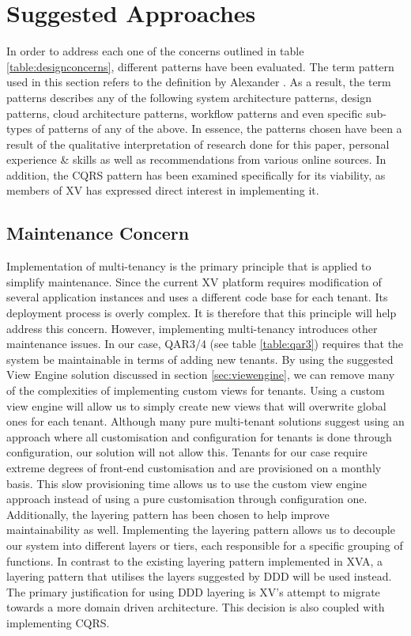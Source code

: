 \section{Suggested Approaches}
In order to address each one of the concerns outlined in table \ref{table:designconcerns}, different patterns have been evaluated. The term pattern used in this section refers to the definition by Alexander \cite{Alexander1977-ni}. As a result, the term patterns describes any of the following system architecture patterns, design patterns, cloud architecture patterns, workflow patterns and even specific sub-types of patterns of any of the above. In essence, the patterns chosen have been a result of the qualitative interpretation of research done for this paper, personal experience \& skills as well as recommendations from various online sources. In addition, the CQRS pattern has been examined specifically for its viability, as members of XV has expressed direct interest in implementing it. 

\subsection{Maintenance Concern}
Implementation of multi-tenancy is the primary principle that is applied to simplify maintenance. Since the current XV platform requires modification of several application instances and uses a different code base for each tenant. Its deployment process is overly complex. It is therefore that this principle will help address this concern. However, implementing multi-tenancy introduces other maintenance issues. In our case, QAR3/4 (see table \ref{table:qar3}) requires that the system be maintainable in terms of adding new tenants. By using the suggested View Engine solution  discussed in section \ref{sec:viewengine}, we can remove many of the complexities of implementing custom views for tenants. Using a custom view engine will allow us to simply create new views that will overwrite global ones for each tenant. Although many pure multi-tenant solutions suggest using an approach where all customisation and configuration for tenants is done through configuration, our solution will not allow this. Tenants for our case require extreme degrees of front-end customisation and are provisioned on a monthly basis. This slow provisioning time allows us to use the custom view engine approach instead of using a pure customisation through configuration one. Additionally, the layering pattern has been chosen to help improve maintainability as well. Implementing the layering pattern allows us to decouple our system into different layers or tiers, each responsible for a specific grouping of functions. In contrast to the existing layering pattern implemented in XVA, a layering pattern that utilises the layers suggested by DDD will be used instead. The primary justification for using DDD layering is XV's attempt to migrate towards a more domain driven architecture. This decision is also coupled with implementing CQRS.


